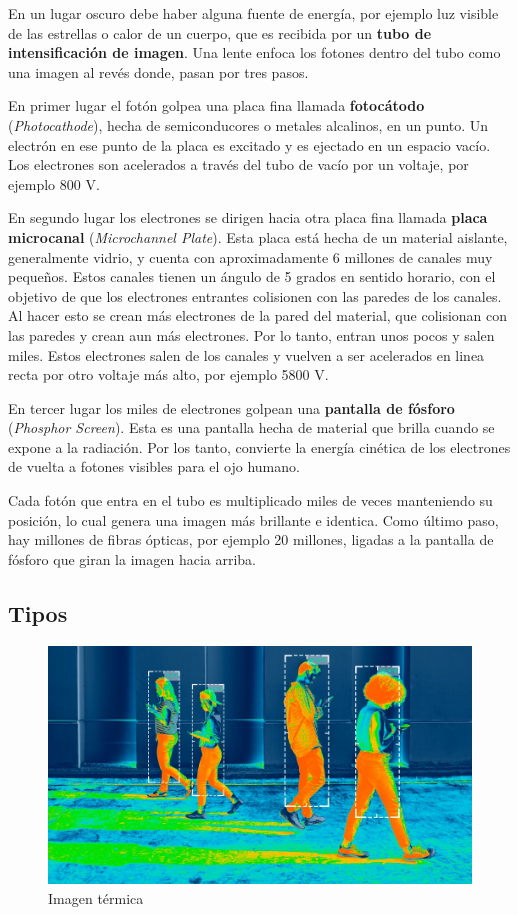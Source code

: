 En un lugar oscuro debe haber alguna fuente de energía, por ejemplo luz visible de las estrellas o calor de un cuerpo, que es recibida por un \textbf{tubo de intensificación de imagen}. Una lente enfoca los fotones dentro del tubo como una imagen al revés donde, pasan por tres pasos.

En primer lugar el fotón golpea una placa fina llamada \textbf{fotocátodo} (\textit{Photocathode}), hecha de semiconducores o metales alcalinos, en un punto. Un electrón en ese punto de la placa es excitado y es ejectado en un espacio vacío. Los electrones son acelerados a través del tubo de vacío por un voltaje, por ejemplo 800 V.

En segundo lugar los electrones se dirigen hacia otra placa fina llamada \textbf{placa microcanal} (\textit{Microchannel Plate}). Esta placa está hecha de un material aislante, generalmente vidrio, y cuenta con aproximadamente 6 millones de canales muy pequeños. Estos canales tienen un ángulo de 5 grados en sentido horario, con el objetivo de que los electrones entrantes colisionen con las paredes de los canales. Al hacer esto se crean más electrones de la pared del material, que colisionan con las paredes y crean aun más electrones. Por lo tanto, entran unos pocos y salen miles. Estos electrones salen de los canales y vuelven a ser acelerados en linea recta por otro voltaje más alto, por ejemplo 5800 V.

En tercer lugar los miles de electrones golpean una \textbf{pantalla de fósforo} (\textit{Phosphor Screen}). Esta es una pantalla hecha de material que brilla cuando se expone a la radiación. Por los tanto, convierte la energía cinética de los electrones de vuelta a fotones visibles para el ojo humano.

Cada fotón que entra en el tubo es multiplicado miles de veces manteniendo su posición, lo cual genera una imagen más brillante e identica. Como último paso, hay millones de fibras ópticas, por ejemplo 20 millones, ligadas a la pantalla de fósforo que giran la imagen hacia arriba\cite{ytvrtbv}.

\subsection{Tipos}

\begin{figure}[H]
  \centering
  \includegraphics[scale=0.3]{imagenes/imagen_termica.png}
  \caption{Imagen térmica\cite{bytronicti}}
\end{figure}

